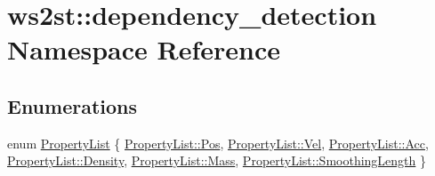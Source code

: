 \hypertarget{namespacews2st_1_1dependency__detection}{}\section{ws2st\+:\+:dependency\+\_\+detection Namespace Reference}
\label{namespacews2st_1_1dependency__detection}
\subsection*{Enumerations}
\begin{DoxyCompactItemize}
\item 
enum \mbox{\hyperlink{namespacews2st_1_1dependency__detection_abcddd986f080a9e5c494edfad3c3faf7}{Property\+List}} \{ \newline
\mbox{\hyperlink{namespacews2st_1_1dependency__detection_abcddd986f080a9e5c494edfad3c3faf7afea4e0fe069dc6f6171dd6044abb2365}{Property\+List\+::\+Pos}}, 
\mbox{\hyperlink{namespacews2st_1_1dependency__detection_abcddd986f080a9e5c494edfad3c3faf7aec930ca2dec8aa0b05a106add08d538e}{Property\+List\+::\+Vel}}, 
\mbox{\hyperlink{namespacews2st_1_1dependency__detection_abcddd986f080a9e5c494edfad3c3faf7a2e02ea7283618d93898c1342e8361dfa}{Property\+List\+::\+Acc}}, 
\mbox{\hyperlink{namespacews2st_1_1dependency__detection_abcddd986f080a9e5c494edfad3c3faf7a7e6d11dd9dbeef53c1cb3cb896bce476}{Property\+List\+::\+Density}}, 
\newline
\mbox{\hyperlink{namespacews2st_1_1dependency__detection_abcddd986f080a9e5c494edfad3c3faf7aff2864d6f652ee0ac254814f1ae4f4a8}{Property\+List\+::\+Mass}}, 
\mbox{\hyperlink{namespacews2st_1_1dependency__detection_abcddd986f080a9e5c494edfad3c3faf7a209c4a2539e3220aadbf61e605f9bfdc}{Property\+List\+::\+Smoothing\+Length}}
 \}
\end{DoxyCompactItemize}
